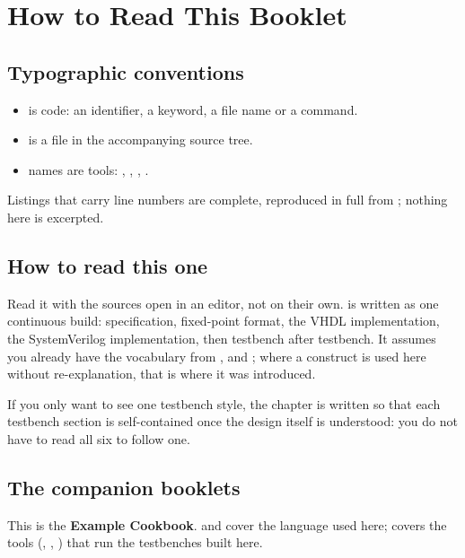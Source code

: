 \chapter*{How to Read This Booklet}

\section*{Typographic conventions}

\begin{itemize}
  \item {} is code: an identifier, a keyword, a file name
        or a command.
  \item {} is a file in the accompanying source
        tree.
  \item {} names are tools: , ,
        , .
\end{itemize}

Listings that carry line numbers are complete, reproduced in full from
; nothing here is excerpted.

\section*{How to read this one}

Read it with the sources open in an editor, not on their own. 
is written as one continuous build: specification, fixed-point format, the
VHDL implementation, the SystemVerilog implementation, then testbench after
testbench. It assumes you already have the vocabulary from
,  and ; where a
construct is used here without re-explanation, that is where it was
introduced.

If you only want to see one testbench style, the chapter is written so that
each testbench section is self-contained once the design itself is
understood: you do not have to read all six to follow one.

\section*{The companion booklets}

This is the \textbf{Example Cookbook}.  and
 cover the language used here;  covers
the tools (, , ) that run the
testbenches built here.

